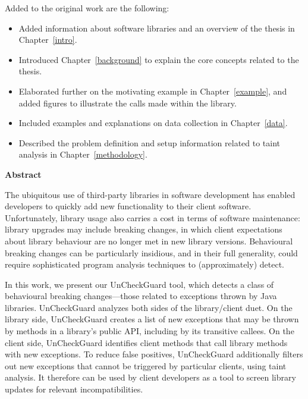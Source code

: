 Added to the original work are the following:

\begin{itemize}
  \item Added information about software libraries and an overview of the thesis in Chapter~\ref{intro}.
  \item Introduced Chapter~\ref{background} to explain the core concepts related to the thesis.
  \item Elaborated further on the motivating example in Chapter~\ref{example}, and added figures to illustrate the calls made within the library.
  \item Included examples and explanations on data collection in Chapter~\ref{data}.
  \item Described the problem definition and setup information related to taint analysis in Chapter~\ref{methodology}.
\end{itemize}

\cleardoublepage
{}    %

\begin{center}\textbf{Abstract}\end{center}

      The ubiquitous use of third-party libraries in software development has enabled developers to quickly add
      new functionality to their client software. Unfortunately, library usage also carries a cost in
      terms of software maintenance: library upgrades may include breaking changes, in which client expectations
      about library behaviour are no longer met in new library versions. Behavioural breaking
      changes can be particularly insidious, and in their full generality, could require sophisticated program
      analysis techniques to (approximately) detect.

      In this work, we present our UnCheckGuard tool, which detects a class of behavioural breaking changes---those
      related to exceptions thrown by Java libraries. UnCheckGuard analyzes both sides of the library/client
      duet. On the library side, UnCheckGuard creates a list of new exceptions that may be thrown by methods
      in a library's public API, including by its transitive callees. On the client side, UnCheckGuard identifies
      client methods that call library methods with new exceptions. To reduce false positives, UnCheckGuard
      additionally filters out new exceptions that cannot be triggered by particular clients, using taint analysis. It therefore can be
      used by client developers as a tool to screen library updates for relevant incompatibilities.

